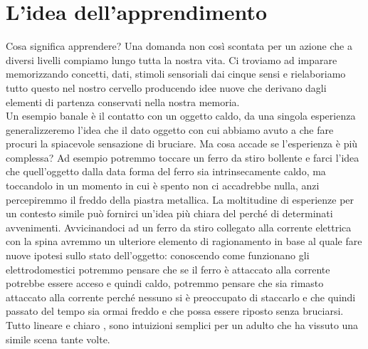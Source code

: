 \section*{L'idea dell'apprendimento}
Cosa significa apprendere? Una domanda non così scontata per un azione che a diversi livelli compiamo lungo tutta la nostra vita. Ci troviamo ad imparare memorizzando concetti, dati, stimoli sensoriali dai cinque sensi e rielaboriamo tutto questo nel nostro cervello producendo idee nuove che derivano dagli elementi di partenza conservati nella nostra memoria.
\\ 
Un esempio banale è il contatto con un oggetto caldo, da una singola esperienza generalizzeremo l'idea che il dato oggetto con cui abbiamo avuto a che fare procuri la spiacevole sensazione di bruciare. Ma cosa accade se l'esperienza è più complessa? Ad esempio potremmo toccare un ferro da stiro bollente e farci l'idea che quell'oggetto dalla data forma del ferro sia intrinsecamente caldo, ma toccandolo in un momento in cui è spento non ci accadrebbe nulla, anzi percepiremmo il freddo della piastra metallica. La moltitudine di esperienze per un contesto simile può fornirci un'idea più chiara del perché di determinati avvenimenti. Avvicinandoci ad un ferro da stiro collegato alla corrente elettrica con la spina avremmo un ulteriore elemento di ragionamento in base al quale fare nuove ipotesi sullo stato dell'oggetto: conoscendo come funzionano gli elettrodomestici potremmo pensare che se il ferro è attaccato alla corrente potrebbe essere acceso e quindi caldo, potremmo pensare che sia rimasto attaccato alla corrente perché nessuno si è preoccupato di staccarlo e che quindi passato del tempo sia ormai freddo e che possa essere riposto senza bruciarsi. Tutto lineare e chiaro , sono intuizioni semplici per un adulto che ha vissuto una simile scena tante volte. 
\\
